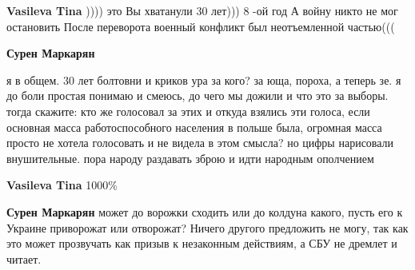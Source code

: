 \begin{itemize}
\begin{itemize}
 
\textbf{Vasileva Tina} )))) это Вы хватанули
30 лет)))
8 -ой год
А войну никто не мог остановить
После переворота военный конфликт был неотъемленной частью(((

 
\textbf{Сурен Маркарян} 

я в общем. 30 лет болтовни и криков ура за кого? за
юща, пороха, а теперь зе. я до боли простая понимаю и смеюсь, до чего мы дожили
и что это за выборы. тогда скажите: кто же голосовал за этих и откуда взялись
эти голоса, если основная масса работоспособного населения в польше была,
огромная масса просто не хотела голосовать и не видела в этом смысла? но цифры
нарисовали внушительные. пора народу раздавать зброю и идти народным ополчением

 
\textbf{Vasileva Tina} 1000\%

 
\textbf{Сурен Маркарян} может до ворожки сходить или до колдуна какого, пусть его к Украине приворожат или отворожат? Ничего другого предложить не могу, так как это может прозвучать как призыв к незаконным действиям, а СБУ не дремлет и читает.

 

\end{itemize}
\end{itemize}
